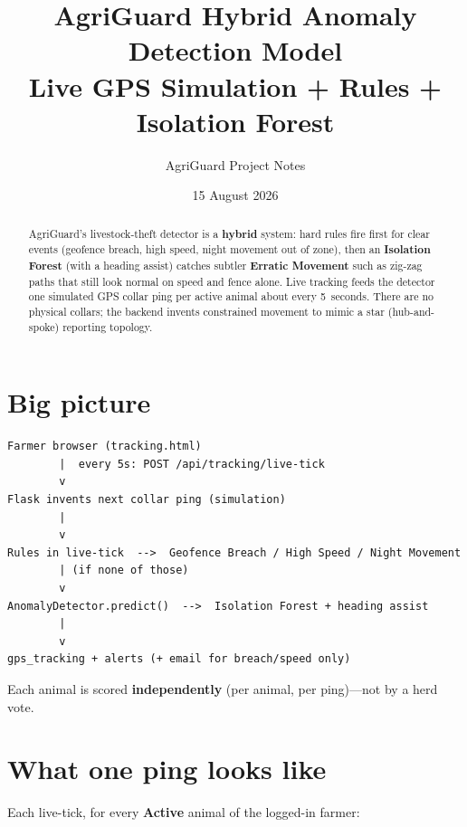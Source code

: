 \documentclass[11pt,a4paper]{article}
\title{AgriGuard Hybrid Anomaly Detection Model\\
\large Live GPS Simulation + Rules + Isolation Forest}
\author{AgriGuard Project Notes}
\date{15 August 2026}
\begin{document}
\maketitle

\begin{abstract}
AgriGuard's livestock-theft detector is a \textbf{hybrid} system: hard rules fire first for
clear events (geofence breach, high speed, night movement out of zone), then an
\textbf{Isolation Forest} (with a heading assist) catches subtler
\textbf{Erratic Movement} such as zig-zag paths that still look normal on speed and fence alone.
Live tracking feeds the detector one simulated GPS collar ping per active animal about every
5~seconds. There are no physical collars; the backend invents constrained movement to mimic
a star (hub-and-spoke) reporting topology.
\end{abstract}

\tableofcontents
\vspace{1em}

\section{Big picture}

\begin{lstlisting}
Farmer browser (tracking.html)
        |  every 5s: POST /api/tracking/live-tick
        v
Flask invents next collar ping (simulation)
        |
        v
Rules in live-tick  -->  Geofence Breach / High Speed / Night Movement
        | (if none of those)
        v
AnomalyDetector.predict()  -->  Isolation Forest + heading assist
        |
        v
gps_tracking + alerts (+ email for breach/speed only)
\end{lstlisting}

\noindent
Each animal is scored \textbf{independently} (per animal, per ping)---not by a herd vote.

\section{What one ping looks like}

Each live-tick, for every \textbf{Active} animal of the logged-in farmer:
\end{document}
